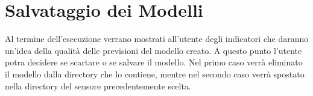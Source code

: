 \documentclass{rapportECL}
\begin{document}
\section{Salvataggio dei Modelli}
Al termine dell'esecuzione verrano mostrati all'utente degli indicatori che daranno un'idea della qualità delle previsioni del modello creato.
A questo punto l'utente potra decidere se scartare o se salvare il modello. Nel primo caso verrà eliminato il modello dalla directory che lo contiene, mentre nel 
secondo caso verrà spostato nella directory del sensore precedentemente scelta. 
\end{document}
